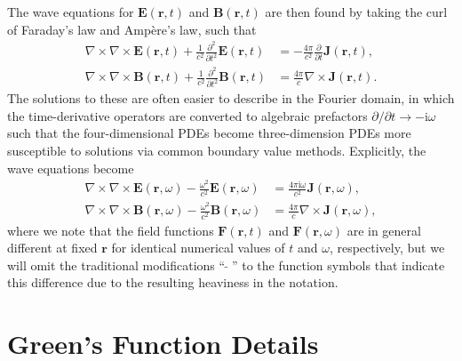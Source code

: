 \documentclass{article}
\numberwithin{equation}{section}
\begin{document}
The wave equations for $\mathbf{E}(\mathbf{r},t)$ and $\mathbf{B}(\mathbf{r},t)$ are then found by taking the curl of Faraday's law and Amp\`{e}re's law, such that
\begin{equation}\label{eq:waveEqTime}
\begin{split}
\nabla\times\nabla\times\mathbf{E}(\mathbf{r},t) + \frac{1}{c^2}\frac{\partial^2}{\partial t^2}\mathbf{E}(\mathbf{r},t) &= -\frac{4\pi}{c^2}\frac{\partial}{\partial t}\mathbf{J}(\mathbf{r},t),\\
\nabla\times\nabla\times\mathbf{B}(\mathbf{r},t) + \frac{1}{c^2}\frac{\partial^2}{\partial t^2}\mathbf{B}(\mathbf{r},t) &= \frac{4\pi}{c}\nabla\times\mathbf{J}(\mathbf{r},t).
\end{split}
\end{equation}
The solutions to these are often easier to describe in the Fourier domain, in which the time-derivative operators are converted to algebraic prefactors $\partial/\partial t\to-\mathrm{i}\omega$ such that the four-dimensional PDEs become three-dimension PDEs more susceptible to solutions via common boundary value methods. Explicitly, the wave equations become
\begin{equation}\label{eq:waveEqFreq}
\begin{split}
\nabla\times\nabla\times\mathbf{E}(\mathbf{r},\omega) - \frac{\omega^2}{c^2}\mathbf{E}(\mathbf{r},\omega) &= \frac{4\pi\mathrm{i}\omega}{c^2}\mathbf{J}(\mathbf{r},\omega),\\
\nabla\times\nabla\times\mathbf{B}(\mathbf{r},\omega) - \frac{\omega^2}{c^2}\mathbf{B}(\mathbf{r},\omega) &= \frac{4\pi}{c}\nabla\times\mathbf{J}(\mathbf{r},\omega),
\end{split}
\end{equation}
where we note that the field functions $\mathbf{F}(\mathbf{r},t)$ and $\mathbf{F}(\mathbf{r},\omega)$ are in general different at fixed $\mathbf{r}$ for identical numerical values of $t$ and $\omega$, respectively, but we will omit the traditional modifications ``$\;\tilde{}\;$'' to the function symbols that indicate this difference due to the resulting heaviness in the notation.











\section{Green's Function Details}\label{app:greenFuncDetails}
\end{document}

